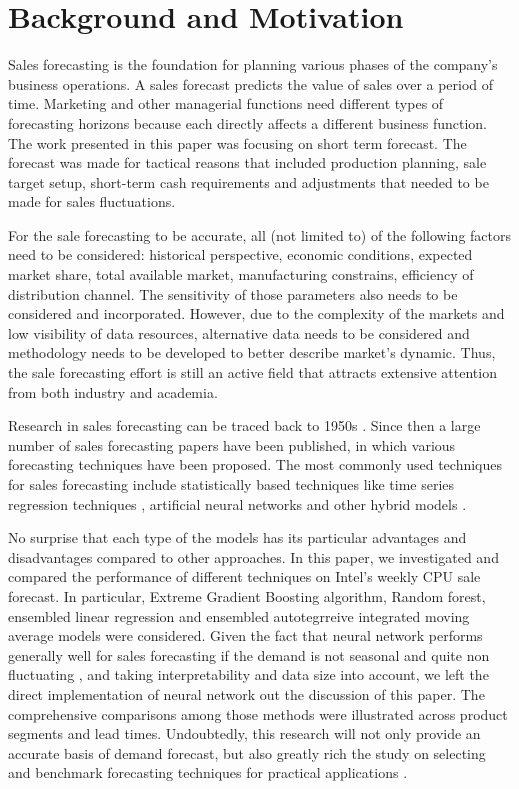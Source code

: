 \documentclass{llncs}
\begin{document}
\section{Background and Motivation}
\label{sec:background}
Sales forecasting is the foundation for planning various phases of the company's business operations. 
A sales forecast predicts the value of sales over a period of time. Marketing and other managerial functions need different types of forecasting horizons because each directly affects a different business function. The work presented in this paper was focusing on short term forecast. The forecast was made for tactical reasons that included production planning, sale target setup, short-term cash requirements and adjustments that needed to be made for sales fluctuations. 


For the sale forecasting to be accurate, all (not limited to) of the following factors need to be considered: historical perspective, economic conditions, expected market share, total available market, manufacturing constrains, efficiency of distribution channel. The sensitivity of those parameters also needs to be considered and incorporated. However, due to the complexity of the markets and low visibility of data resources, alternative data needs to be considered and methodology needs to be developed to better describe market's dynamic. Thus, the sale forecasting effort is still an active field that attracts extensive attention from both industry and academia.

Research in sales forecasting can be traced back to 1950s \cite{Boulden1958}. Since then a large number of sales forecasting papers have been published, in which various forecasting techniques have been proposed. The most commonly used techniques for sales forecasting include statistically based techniques like time series \cite{Winters1960,Box1969,Groff1973} regression techniques \cite{Jain2007}, artificial neural networks \cite{Giles2001,Huang2004,Sharma2012} and other hybrid models \cite{Clements2002,Ferreira2015}. 


No surprise that each type of the models has its particular advantages and disadvantages compared to other approaches. In this paper, we investigated and compared the performance of different techniques on Intel's weekly CPU sale forecast. In particular, Extreme Gradient Boosting algorithm, Random forest, ensembled linear regression and ensembled autotegrreive integrated moving average models were considered. Given the fact that neural network performs generally well for sales forecasting if the demand is not seasonal and quite non fluctuating \cite{Wong2010}, and taking interpretability and data size into account, we left the direct implementation of neural network out the discussion of this paper. The comprehensive comparisons among those methods were illustrated across product segments and lead times. 
Undoubtedly, this research will not only provide an accurate basis of demand forecast, but also greatly rich the study on selecting and benchmark forecasting techniques for practical applications .
\end{document}
